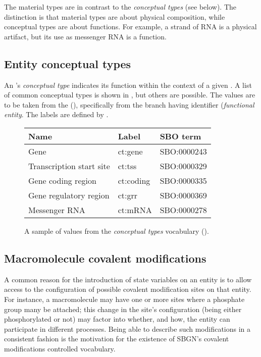 The material types are in contrast to the \emph{conceptual types} (see below).  The distinction is that material types are about physical composition, while conceptual types are about functions.  For example, a strand of RNA is a physical artifact, but its use as messenger RNA is a function.


\subsection{Entity conceptual types}
\label{sec:conceptual-types-cv}

An 's \emph{conceptual type} indicates its function within the context of a given \ER.  A list of common conceptual types is shown in , but others are possible.  The values are to be taken from the \sbo (\sbourl), specifically from the branch having identifier  (\emph{functional entity}.  The labels are defined by \SBGNERLone.

\begin{figure}[h]
  \centering
  \begin{tabular}{l>{\ttfamily}ll}
    \toprule
    \textbf{Name}              & \textbf{\rmfamily Label} & \textbf{SBO term} \\
    \midrule
    Gene                      & ct:gene   & SBO:0000243\\
    Transcription start site  & ct:tss    & SBO:0000329\\
    Gene coding region        & ct:coding & SBO:0000335\\
    Gene regulatory region    & ct:grr    & SBO:0000369\\
    Messenger RNA             & ct:mRNA   & SBO:0000278\\
    \bottomrule
  \end{tabular}
  \caption{A sample of values from the \emph{conceptual types} vocabulary
    ().}
  \label{fig:conceptual-types-cv}
\end{figure}

\subsection{Macromolecule covalent modifications}
\label{sec:covalent-mod-cv}

A common reason for the introduction of state variables on an entity is to allow access to the configuration of possible covalent modification sites on that entity.  For instance, a macromolecule may have one or more sites where a phosphate group many be attached; this change in the site's configuration (\ie being either phosphorylated or not) may factor into whether, and how, the entity can participate in different processes.  Being able to describe such modifications in a consistent fashion is the motivation for the existence of SBGN's covalent modifications controlled vocabulary.  

